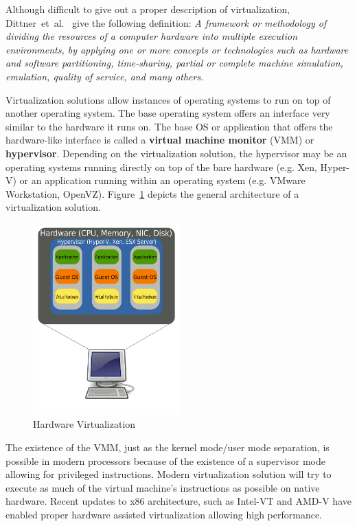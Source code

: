 Although difficult to give out a proper description of virtualization, Dittner~et~al.~\cite{best-damn-virt} give the following definition: \textit{A framework
or methodology of dividing the resources of a computer hardware into multiple
execution environments, by applying one or more concepts or technologies such
as hardware and software partitioning, time-sharing, partial or complete
machine simulation, emulation, quality of service, and many others}.

Virtualization solutions allow instances of operating systems to run on top of
another operating system. The base operating system offers an interface very
similar to the hardware it runs on. The base OS or application that offers the
hardware-like interface is called a \textbf{virtual machine monitor} (VMM) or
\textbf{hypervisor}. Depending on the virtualization solution, the hypervisor
may be an operating systems running directly on top of the bare hardware (e.g.
Xen, Hyper-V) or an application running within an operating system (e.g.
VMware Workstation, OpenVZ).
Figure~\ref{fig:virt-infra:hardware-virtualization} depicts the general
architecture of a virtualization solution.

\begin{figure}
  \centering
  \includegraphics[width=0.5\textwidth]{src/img/virt-infra/hardware-virtualization}
  \caption{Hardware Virtualization}
  \label{fig:virt-infra:hardware-virtualization}
\end{figure}

The existence of the VMM, just as the kernel mode/user mode separation, is
possible in modern processors because of the existence of a supervisor mode
allowing for privileged instructions. Modern virtualization solution will try
to execute as much of the virtual machine's instructions as possible on native
hardware. Recent updates to x86 architecture, such as Intel-VT and AMD-V have
enabled proper hardware assisted virtualization allowing high performance.

